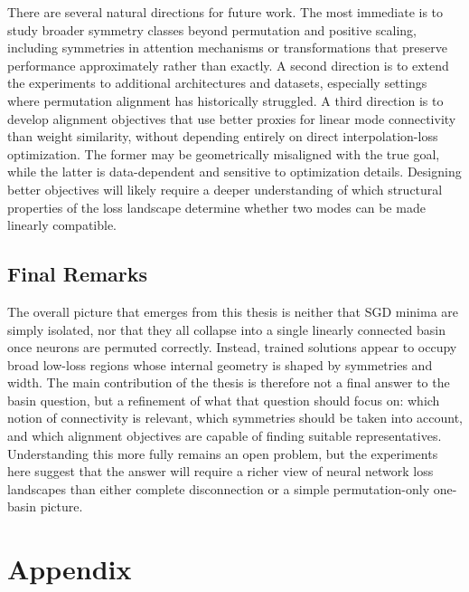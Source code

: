 \documentclass[11pt,a4paper]{report}
\begin{document}
There are several natural directions for future work. The most immediate is to study broader symmetry classes beyond permutation and positive scaling, including symmetries in attention mechanisms or transformations that preserve performance approximately rather than exactly. A second direction is to extend the experiments to additional architectures and datasets, especially settings where permutation alignment has historically struggled. A third direction is to develop alignment objectives that use better proxies for linear mode connectivity than weight similarity, without depending entirely on direct interpolation-loss optimization. The former may be geometrically misaligned with the true goal, while the latter is data-dependent and sensitive to optimization details. Designing better objectives will likely require a deeper understanding of which structural properties of the loss landscape determine whether two modes can be made linearly compatible.

\section{Final Remarks}

The overall picture that emerges from this thesis is neither that SGD minima are simply isolated, nor that they all collapse into a single linearly connected basin once neurons are permuted correctly. Instead, trained solutions appear to occupy broad low-loss regions whose internal geometry is shaped by symmetries and width. The main contribution of the thesis is therefore not a final answer to the basin question, but a refinement of what that question should focus on: which notion of connectivity is relevant, which symmetries should be taken into account, and which alignment objectives are capable of finding suitable representatives. Understanding this more fully remains an open problem, but the experiments here suggest that the answer will require a richer view of neural network loss landscapes than either complete disconnection or a simple permutation-only one-basin picture.




\chapter*{Appendix}
\label{app:append}
\setcounter{section}{0}
\setcounter{subsection}{0}
\renewcommand{\thesection}{A.\arabic{section}}
\end{document}
